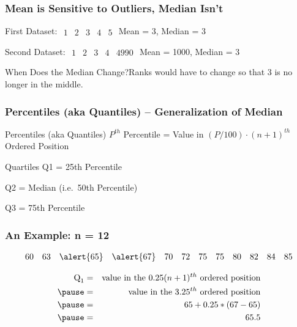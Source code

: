 \begin{frame}
\frametitle{Mean is Sensitive to Outliers, Median Isn't}

\begin{block}{First Dataset: $\begin{array}{ccccc}1& 2& 3& 4& 5\end{array}$}
Mean = 3, Median = 3
\end{block}
\pause

\begin{block}{Second Dataset: $\begin{array}{ccccc}1& 2& 3& 4& 4990\end{array}$}
Mean = 1000, Median = 3
\end{block}
\pause
\begin{alertblock}{When Does the Median Change?}Ranks would have to change so that 3 is no longer in the middle.\end{alertblock}

\end{frame}
\begin{frame}
\frametitle{Percentiles (aka Quantiles) -- Generalization of Median}
\begin{center} \end{center}
\vspace{1.5em}
\begin{block}{Percentiles (aka Quantiles)}
$P^{th}$ Percentile = Value in  $\left(P/100\right)\cdot (n+1)^{th}$ Ordered Position
\end{block}
\pause
\begin{block}{Quartiles}
Q1 = 25th Percentile

Q2 =  Median (i.e.\ 50th Percentile)

Q3 = 75th Percentile
\end{block}

\end{frame}


\begin{frame}
\frametitle{An Example: n = 12}
$$\begin{array}{cccccccccccc}
60&63&\alert{65}&\alert{67}&70&72&75&75&80&82&84&85
\end{array}$$

\begin{eqnarray*}\mbox{Q}_1 &=& \mbox{value in the } 0.25(n+1)^{th}\mbox{ ordered position}\\\pause
	&=& \mbox{value in the } 3.25^{th}\mbox{ ordered position}\\\pause
	&=& 65 + 0.25 * (67 - 65)\\\pause
	&=& 65.5
\end{eqnarray*}
\end{frame}

